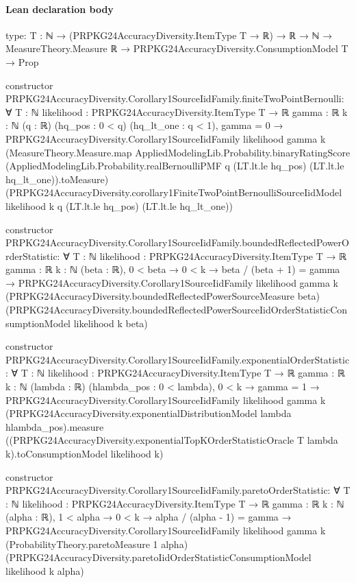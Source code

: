 \documentclass[10pt]{article}
\begin{document}
\paragraph{Lean declaration body}
\begin{ReviewVerbatim}
type:
{T : ℕ} →
  (PRPKG24AccuracyDiversity.ItemType T → ℝ) →
    ℝ → ℕ → MeasureTheory.Measure ℝ → PRPKG24AccuracyDiversity.ConsumptionModel T → Prop

constructor PRPKG24AccuracyDiversity.Corollary1SourceIidFamily.finiteTwoPointBernoulli:
∀ {T : ℕ} {likelihood : PRPKG24AccuracyDiversity.ItemType T → ℝ} {gamma : ℝ} {k : ℕ} (q : ℝ) (hq_pos : 0 < q)
  (hq_lt_one : q < 1),
  gamma = 0 →
    PRPKG24AccuracyDiversity.Corollary1SourceIidFamily likelihood gamma k
      (MeasureTheory.Measure.map AppliedModelingLib.Probability.binaryRatingScore
        (AppliedModelingLib.Probability.realBernoulliPMF q (LT.lt.le hq_pos) (LT.lt.le hq_lt_one)).toMeasure)
      (PRPKG24AccuracyDiversity.corollary1FiniteTwoPointBernoulliSourceIidModel likelihood k q (LT.lt.le hq_pos)
        (LT.lt.le hq_lt_one))

constructor PRPKG24AccuracyDiversity.Corollary1SourceIidFamily.boundedReflectedPowerOrderStatistic:
∀ {T : ℕ} {likelihood : PRPKG24AccuracyDiversity.ItemType T → ℝ} {gamma : ℝ} {k : ℕ} (beta : ℝ),
  0 < beta →
    0 < k →
      beta / (beta + 1) = gamma →
        PRPKG24AccuracyDiversity.Corollary1SourceIidFamily likelihood gamma k
          (PRPKG24AccuracyDiversity.boundedReflectedPowerSourceMeasure beta)
          (PRPKG24AccuracyDiversity.boundedReflectedPowerSourceIidOrderStatisticConsumptionModel likelihood k beta)

constructor PRPKG24AccuracyDiversity.Corollary1SourceIidFamily.exponentialOrderStatistic:
∀ {T : ℕ} {likelihood : PRPKG24AccuracyDiversity.ItemType T → ℝ} {gamma : ℝ} {k : ℕ} (lambda : ℝ)
  (hlambda_pos : 0 < lambda),
  0 < k →
    gamma = 1 →
      PRPKG24AccuracyDiversity.Corollary1SourceIidFamily likelihood gamma k
        (PRPKG24AccuracyDiversity.exponentialDistributionModel lambda hlambda_pos).measure
        ((PRPKG24AccuracyDiversity.exponentialTopKOrderStatisticOracle T lambda k).toConsumptionModel likelihood k)

constructor PRPKG24AccuracyDiversity.Corollary1SourceIidFamily.paretoOrderStatistic:
∀ {T : ℕ} {likelihood : PRPKG24AccuracyDiversity.ItemType T → ℝ} {gamma : ℝ} {k : ℕ} (alpha : ℝ),
  1 < alpha →
    0 < k →
      alpha / (alpha - 1) = gamma →
        PRPKG24AccuracyDiversity.Corollary1SourceIidFamily likelihood gamma k (ProbabilityTheory.paretoMeasure 1 alpha)
          (PRPKG24AccuracyDiversity.paretoIidOrderStatisticConsumptionModel likelihood k alpha)
\end{ReviewVerbatim}
\end{document}
